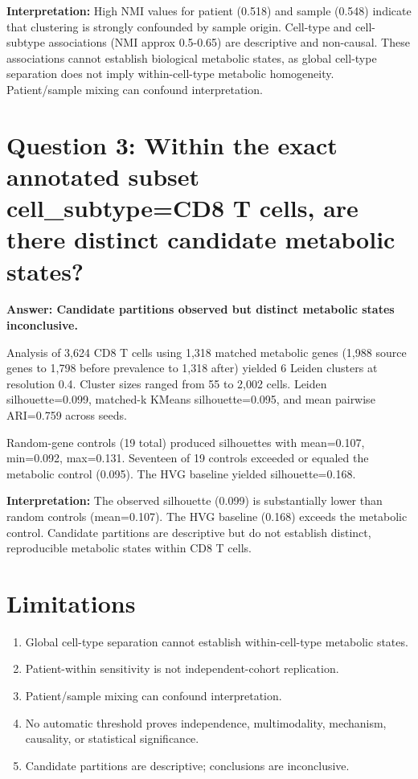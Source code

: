 \documentclass[11pt, a4paper]{article}
\begin{document}
\textbf{Interpretation:} High NMI values for patient (0.518) and sample (0.548) indicate that clustering is strongly confounded by sample origin. Cell-type and cell-subtype associations (NMI approx 0.5-0.65) are descriptive and non-causal. These associations cannot establish biological metabolic states, as global cell-type separation does not imply within-cell-type metabolic homogeneity. Patient/sample mixing can confound interpretation.

\section{Question 3: Within the exact annotated subset cell\_subtype=CD8 T cells, are there distinct candidate metabolic states?}

\textbf{Answer: Candidate partitions observed but distinct metabolic states inconclusive.}

Analysis of 3,624 CD8 T cells using 1,318 matched metabolic genes (1,988 source genes to 1,798 before prevalence to 1,318 after) yielded 6 Leiden clusters at resolution 0.4. Cluster sizes ranged from 55 to 2,002 cells. Leiden silhouette=0.099, matched-k KMeans silhouette=0.095, and mean pairwise ARI=0.759 across seeds.

Random-gene controls (19 total) produced silhouettes with mean=0.107, min=0.092, max=0.131. Seventeen of 19 controls exceeded or equaled the metabolic control (0.095). The HVG baseline yielded silhouette=0.168.

\textbf{Interpretation:} The observed silhouette (0.099) is substantially lower than random controls (mean=0.107). The HVG baseline (0.168) exceeds the metabolic control. Candidate partitions are descriptive but do not establish distinct, reproducible metabolic states within CD8 T cells.

\section{Limitations}

\begin{enumerate}
    \item Global cell-type separation cannot establish within-cell-type metabolic states.
    \item Patient-within sensitivity is not independent-cohort replication.
    \item Patient/sample mixing can confound interpretation.
    \item No automatic threshold proves independence, multimodality, mechanism, causality, or statistical significance.
    \item Candidate partitions are descriptive; conclusions are inconclusive.
\end{enumerate}
\end{document}
